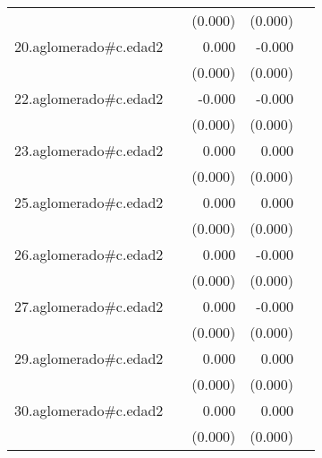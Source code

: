 {\begin{longtable}{l*{4}{D{.}{.}{-1}}}
            &                     &     (0.000)         &     (0.000)         &                     \\
\addlinespace
20.aglomerado#c.edad2&                     &       0.000         &      -0.000         &                     \\
            &                     &     (0.000)         &     (0.000)         &                     \\
\addlinespace
22.aglomerado#c.edad2&                     &      -0.000         &      -0.000\sym{**} &                     \\
            &                     &     (0.000)         &     (0.000)         &                     \\
\addlinespace
23.aglomerado#c.edad2&                     &       0.000         &       0.000         &                     \\
            &                     &     (0.000)         &     (0.000)         &                     \\
\addlinespace
25.aglomerado#c.edad2&                     &       0.000         &       0.000         &                     \\
            &                     &     (0.000)         &     (0.000)         &                     \\
\addlinespace
26.aglomerado#c.edad2&                     &       0.000         &      -0.000         &                     \\
            &                     &     (0.000)         &     (0.000)         &                     \\
\addlinespace
27.aglomerado#c.edad2&                     &       0.000         &      -0.000         &                     \\
            &                     &     (0.000)         &     (0.000)         &                     \\
\addlinespace
29.aglomerado#c.edad2&                     &       0.000\sym{*}  &       0.000         &                     \\
            &                     &     (0.000)         &     (0.000)         &                     \\
\addlinespace
30.aglomerado#c.edad2&                     &       0.000         &       0.000         &                     \\
            &                     &     (0.000)         &     (0.000)         &                     \\

\end{longtable}}
